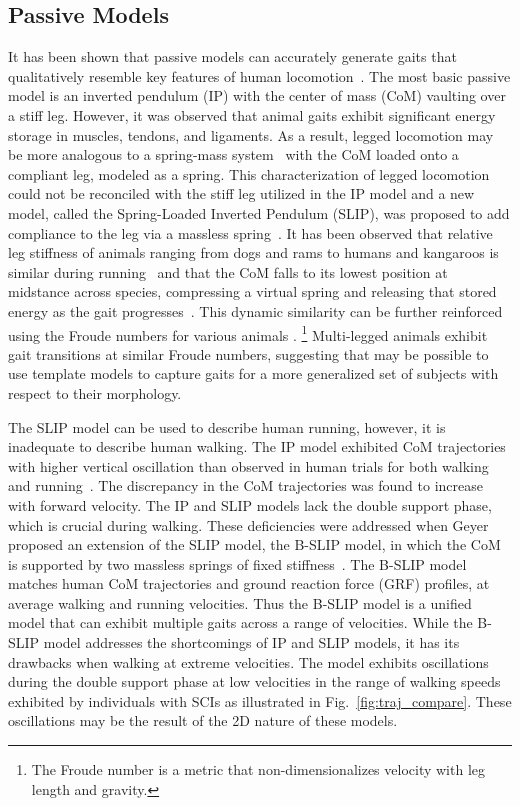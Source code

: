 \subsection{Passive Models}

It has been shown that passive models can accurately generate gaits that qualitatively resemble key features of human locomotion~\cite{mochon1980ballistic}. The most basic passive model is an inverted pendulum (IP) with the center of mass (CoM) vaulting over a stiff leg. However, it was observed that animal gaits exhibit significant energy storage in muscles, tendons, and ligaments. As a result, legged locomotion may be more analogous to a spring-mass system~\cite{blickhan1989spring} with the CoM loaded onto a compliant leg, modeled as a spring. This characterization of legged locomotion could not be reconciled with the stiff leg utilized in the IP model and a new model, called the Spring-Loaded Inverted Pendulum (SLIP), was proposed to add compliance to the leg via a massless spring~\cite{blickhan1989spring}. It has been observed that relative leg stiffness of animals ranging from dogs and rams to humans and kangaroos is similar during running~\cite{blickhan1993similarity} and that the CoM falls to its lowest position at midstance across species, compressing a virtual spring and releasing that stored energy as the gait progresses~\cite{full1999templates}. This dynamic similarity can be further reinforced using the Froude numbers for various animals \cite{alexander1984gaits}. \footnote{The Froude number is a metric that non-dimensionalizes velocity with leg length and gravity.} Multi-legged animals exhibit gait transitions at similar Froude numbers, suggesting that may be possible to use template models to capture gaits for a more generalized set of subjects with respect to their morphology.

The SLIP model can be used to describe human running, however, it is inadequate to describe human walking. The IP model exhibited CoM trajectories with higher vertical oscillation than observed in human trials for both walking and running~\cite{lee1998determinants}. The discrepancy in the CoM trajectories was found to increase with forward velocity. The IP and SLIP models lack the double support phase, which is crucial during walking. These deficiencies were addressed when Geyer proposed an extension of the SLIP model, the B-SLIP model, in which the CoM is supported by two massless springs of fixed stiffness~\cite{geyer2006compliant}. The  B-SLIP model matches human CoM trajectories and ground reaction force (GRF) profiles, at average walking and running velocities. Thus the B-SLIP model is a unified model that can exhibit multiple gaits across a range of velocities. While the B-SLIP model addresses the shortcomings of IP and SLIP models, it has its drawbacks when walking at extreme velocities. The model exhibits oscillations during the double support phase at low velocities in the range of walking speeds exhibited by individuals with SCIs as illustrated in Fig.~\ref{fig:traj_compare}. These oscillations may be the result of the 2D nature of these models.

